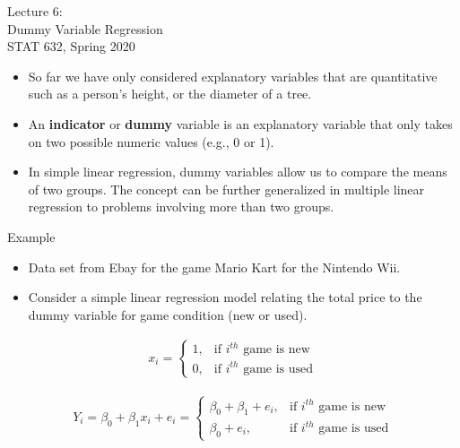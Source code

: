 \documentclass[10pt]{beamer}
\begin{document}
\begin{frame}
\large
Lecture 6:\\
Dummy Variable Regression\\
STAT 632, Spring 2020
\end{frame}

\begin{frame}
\begin{itemize}
\item So far we have only considered explanatory variables that are quantitative such as a person's height, or the diameter of a tree.
\vspace{5pt}
\item An \textbf{indicator} or \textbf{dummy} variable is an explanatory variable that only takes on two possible numeric values (e.g., 0 or 1). 
\vspace{5pt}
\item In simple linear regression, dummy variables allow us to compare the means of two groups.  The concept can be further generalized in multiple linear regression to problems involving more than two groups. 
\end{itemize}
\end{frame}

\begin{frame}{Example}
\begin{itemize}
\item Data set from Ebay for the game Mario Kart for the Nintendo Wii.
\vspace{5pt}
\item Consider a simple linear regression model relating the total price to the dummy variable for game condition (new or used).
\end{itemize}
\begin{align*}
x_i = \begin{cases}
  1, & \text{if $i^{th}$ game is new}\\
  0, & \text{if $i^{th}$ game is used}
\end{cases}
\end{align*}

\begin{align*}
Y_i = \beta_0 + \beta_1 x_i + e_i 
= \begin{cases}
\beta_0 + \beta_1 + e_i, & \text{if $i^{th}$ game is new}\\
\beta_0 + e_i, & \text{if $i^{th}$ game is used}
\end{cases}
\end{align*}
\end{frame}
\end{document}
